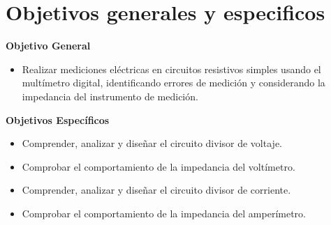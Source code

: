 \documentclass[twoside,twocolumn]{article}
\begin{document}

\section{Objetivos generales y especificos}

\textbf{Objetivo General} 
\begin{itemize}
\item Realizar mediciones eléctricas en circuitos resistivos simples usando el multímetro digital, identificando errores de medición y considerando la impedancia del instrumento de medición.
\end{itemize}

\textbf{Objetivos Específicos}

\begin{itemize}
\item Comprender, analizar y diseñar el circuito divisor de voltaje.
\item Comprobar el comportamiento de la impedancia del voltímetro.
\item Comprender, analizar y diseñar el circuito divisor de corriente.
\item Comprobar el comportamiento de la impedancia del amperímetro.
\end{itemize}


\end{document}
